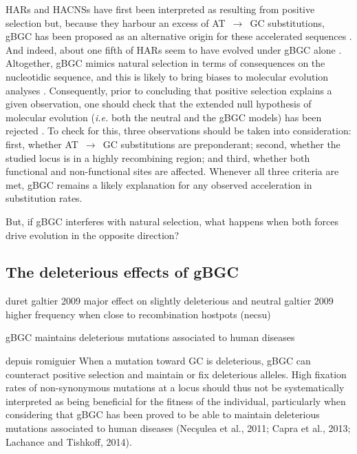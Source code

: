 HARs and HACNSs have first been interpreted as resulting from positive selection \citep[reviewed in][]{hubisz2014exploring} but, because they harbour an excess of AT~$\rightarrow$~GC substitutions, gBGC has been proposed as an alternative origin for these accelerated sequences \citep{galtier2007adaptation,berglund2009hotspots,duret2009comment,katzman2010gcbiased,ratnakumar2010detecting}.
And indeed, about one fifth of HARs seem to have evolved under gBGC alone \citep{kostka2012role}.\\


Altogether, gBGC mimics natural selection in terms of consequences on the nucleotidic sequence, and this is likely to bring biases to molecular evolution analyses \citep{berglund2009hotspots,ratnakumar2010detecting,webster2012direct,romiguier2017analytical,bolivar2018biased,bolivar2019gcbiased}.
Consequently, prior to concluding that positive selection explains a given observation, one should check that the extended null hypothesis of molecular evolution (\textit{i.e.} both the neutral and the gBGC models) has been rejected \citep{galtier2007adaptation, duret2009biased}.
To check for this, three observations should be taken into consideration: first, whether AT~$\rightarrow$~GC substitutions are preponderant; second, whether the studied locus is in a highly recombining region; and third, whether both functional and non-functional sites are affected.
Whenever all three criteria are met, gBGC remains a likely explanation for any observed acceleration in substitution rates.

But, if gBGC interferes with natural selection, what happens when both forces drive evolution in the opposite direction? 




\subsection{The deleterious effects of gBGC}


duret galtier 2009 major effect on slightly deleterious	and neutral
galtier 2009
higher frequency when close to recombination hostpots (necsu)

gBGC maintains deleterious mutations associated to human diseases \citep{necsulea2011meiotic,capra2013modelbased,lachance2014biased,xue2016basebiased}



depuis romiguier
When a mutation toward GC is deleterious, gBGC can counteract positive selection and maintain or fix deleterious alleles. High fixation rates of non-synonymous mutations at a locus should thus not be systematically interpreted as being beneficial for the fitness of the individual, particularly when considering that gBGC has been proved to be able to maintain deleterious mutations associated to human diseases (Necşulea et al., 2011; Capra et al., 2013; Lachance and Tishkoff, 2014).




